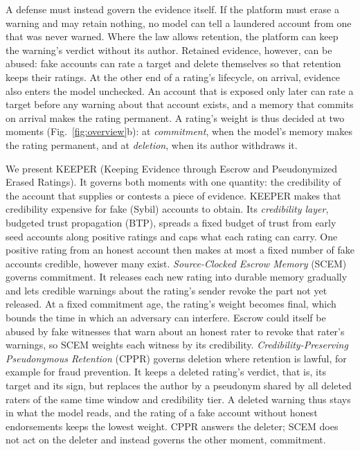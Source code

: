 \documentclass[lettersize,journal]{IEEEtran}
\begin{document}
A defense must instead govern the evidence itself.
If the platform must erase a warning and may retain nothing, no model can tell a laundered account from one that was never warned.
Where the law allows retention, the platform can keep the warning's verdict without its author.
Retained evidence, however, can be abused: fake accounts can rate a target and delete themselves so that retention keeps their ratings.
At the other end of a rating's lifecycle, on arrival, evidence also enters the model unchecked.
An account that is exposed only later can rate a target before any warning about that account exists, and a memory that commits on arrival makes the rating permanent.
A rating's weight is thus decided at two moments (Fig.~\ref{fig:overview}b): at \emph{commitment}, when the model's memory makes the rating permanent, and at \emph{deletion}, when its author withdraws it.

We present KEEPER (Keeping Evidence through Escrow and Pseudonymized Erased Ratings). It governs both moments with one quantity: the credibility of the account that supplies or contests a piece of evidence. KEEPER makes that credibility expensive for fake (Sybil) accounts to obtain.
Its \emph{credibility layer}, budgeted trust propagation (BTP), spreads a fixed budget of trust from early seed accounts along positive ratings and caps what each rating can carry.
One positive rating from an honest account then makes at most a fixed number of fake accounts credible, however many exist.
\emph{Source-Clocked Escrow Memory} (SCEM) governs commitment.
It releases each new rating into durable memory gradually and lets credible warnings about the rating's sender revoke the part not yet released. At a fixed commitment age, the rating's weight becomes final, which bounds the time in which an adversary can interfere.
Escrow could itself be abused by fake witnesses that warn about an honest rater to revoke that rater's warnings, so SCEM weights each witness by its credibility.
\emph{Credibility-Preserving Pseudonymous Retention} (CPPR) governs deletion where retention is lawful, for example for fraud prevention.
It keeps a deleted rating's verdict, that is, its target and its sign, but replaces the author by a pseudonym shared by all deleted raters of the same time window and credibility tier.
A deleted warning thus stays in what the model reads, and the rating of a fake account without honest endorsements keeps the lowest weight.
CPPR answers the deleter; SCEM does not act on the deleter and instead governs the other moment, commitment.
\end{document}
